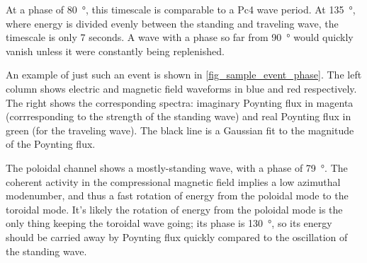 At a phase of \SI{80}{\degree}, this timescale is comparable to a Pc4 wave period. At \SI{135}{\degree}, where energy is divided evenly between the standing and traveling wave, the timescale is only 7 seconds. A wave with a phase so far from \SI{90}{\degree} would quickly vanish unless it were constantly being replenished. 

An example of just such an event is shown in \cref{fig_sample_event_phase}.  The left column shows electric and magnetic field waveforms in blue and red respectively. The right shows the corresponding spectra: imaginary Poynting flux in magenta (corrresponding to the strength of the standing wave) and real Poynting flux in green (for the traveling wave). The black line is a Gaussian fit to the magnitude of the Poynting flux. 

The poloidal channel shows a mostly-standing wave, with a phase of \SI{79}{\degree}. The coherent activity in the compressional magnetic field implies a low azimuthal modenumber, and thus a fast rotation of energy from the poloidal mode to the toroidal mode. It's likely the rotation of energy from the poloidal mode is the only thing keeping the toroidal wave going; its phase is \SI{130}{\degree}, so its energy should be carried away by Poynting flux quickly compared to the oscillation of the standing wave. 

